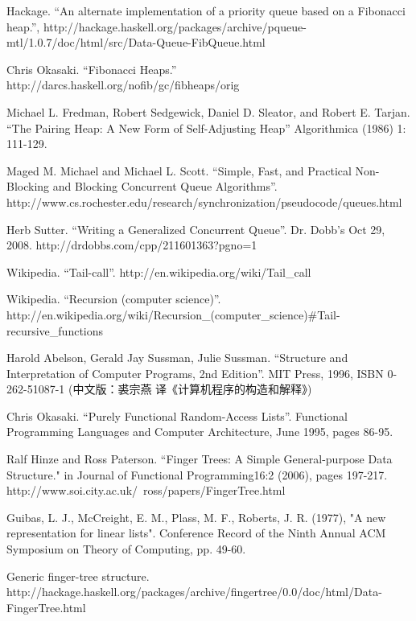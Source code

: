 \documentclass[UTF8]{article}
\begin{document}
\begin{thebibliography}{99}
Hackage. ``An alternate implementation of a priority queue based on a Fibonacci heap.'', http://hackage.haskell.org/packages/archive/pqueue-mtl/1.0.7/doc/html/src/Data-Queue-FibQueue.html

Chris Okasaki. ``Fibonacci Heaps.'' http://darcs.haskell.org/nofib/gc/fibheaps/orig

Michael L. Fredman, Robert Sedgewick, Daniel D. Sleator, and Robert E. Tarjan. ``The Pairing Heap: A New Form of Self-Adjusting Heap'' Algorithmica (1986) 1: 111-129.

Maged M. Michael and Michael L. Scott. ``Simple, Fast, and Practical Non-Blocking and Blocking Concurrent Queue Algorithms''. http://www.cs.rochester.edu/research/synchronization/pseudocode/queues.html

Herb Sutter. ``Writing a Generalized Concurrent Queue''. Dr. Dobb's Oct 29, 2008. http://drdobbs.com/cpp/211601363?pgno=1

Wikipedia. ``Tail-call''. http://en.wikipedia.org/wiki/Tail\_call

Wikipedia. ``Recursion (computer science)''. http://en.wikipedia.org/wiki/Recursion\_(computer\_science)\#Tail-recursive\_functions

Harold Abelson, Gerald Jay Sussman, Julie Sussman. ``Structure and Interpretation of Computer Programs, 2nd Edition''. MIT Press, 1996, ISBN 0-262-51087-1 (中文版：裘宗燕 译《计算机程序的构造和解释》)


Chris Okasaki. ``Purely Functional Random-Access Lists''. Functional Programming Languages and Computer Architecture, June 1995, pages 86-95.

Ralf Hinze and Ross Paterson. ``Finger Trees: A Simple General-purpose Data Structure." in Journal of Functional Programming16:2 (2006), pages 197-217. http://www.soi.city.ac.uk/~ross/papers/FingerTree.html

Guibas, L. J., McCreight, E. M., Plass, M. F., Roberts, J. R. (1977), "A new representation for linear lists". Conference Record of the Ninth Annual ACM Symposium on Theory of Computing, pp. 49-60.

Generic finger-tree structure. http://hackage.haskell.org/packages/archive/fingertree/0.0/doc/html/Data-FingerTree.html


\end{thebibliography}
\end{document}
